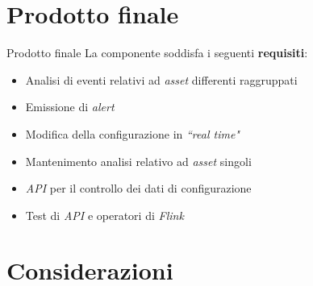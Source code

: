\documentclass{beamer}
\begin{document}
	
	
	\section{Prodotto finale}

	\begin{frame}{Prodotto finale}
		La componente soddisfa i seguenti \textbf{requisiti}:
		\vspace{.2em}
		\begin{itemize}
			\item Analisi di eventi relativi ad \textit{asset} differenti raggruppati \vspace{.5em}
			\item Emissione di \textit{alert} \vspace{.5em}
			\item Modifica della configurazione in \textit{``real time"} \vspace{.5em}
			\item Mantenimento analisi relativo ad \textit{asset} singoli \vspace{.5em}
			\item \textit{API} per il controllo dei dati di configurazione \vspace{.5em}
			\item Test di \textit{API} e operatori di \textit{Flink} \vspace{.5em}
		\end{itemize}
	\end{frame}
	
	\section{Considerazioni}
\end{document}
